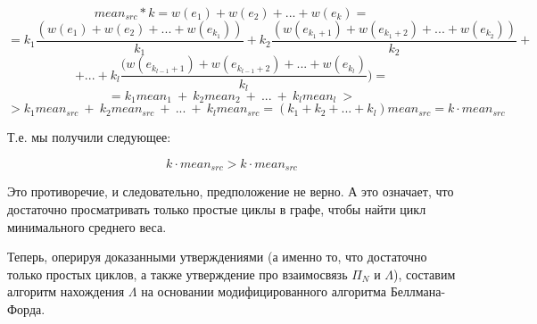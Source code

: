 \documentclass[a4paper,12pt]{report}
\theoremstyle{plain} %
\theoremstyle{definition}
\theoremstyle{remark}
\begin{document}
\begin{large}
$$mean_{src} * k = w(e_1) + w(e_2) + ... + w(e_k) =$$
$$= k_1\frac{(w(e_1) +  w(e_2) +  ... + w(e_{k_1}))}{k_1} + k_2\frac{(w(e_{k_1+1}) + w(e_{k_1+2}) + ... + w(e_{k_2}))}{k_2} +$$
$$+ ... + k_l\frac{(w(e_{k_{l-1}+1}) + w(e_{k_{l-1}+2}) + ... + w(e_{k_l})}{k_l}) = $$
$$=k_1mean_1 ~+ ~k_2mean_2 ~+ ~... ~+ ~k_lmean_l~ >$$
$$> k_1mean_{src}~ +~ k_2mean_{src}~ +~ ...~ +~ k_lmean_{src} = (k_1 + k_2 + ... + k_l)mean_{src} = k \cdot mean_{src}$$

Т.е. мы получили следующее:

$$k \cdot mean_{src} > k \cdot mean_{src}$$

Это противоречие, и следовательно, предположение не верно. А это означает, что достаточно просматривать только простые циклы в графе, чтобы найти цикл минимального среднего веса.

Теперь, оперируя доказанными утверждениями (а именно то, что достаточно только простых циклов, а также утверждение про взаимосвязь $\Pi_N$ и $\Lambda$), составим алгоритм нахождения $\Lambda$ на основании модифицированного алгоритма Беллмана-Форда.


\end{large}
\end{document}

